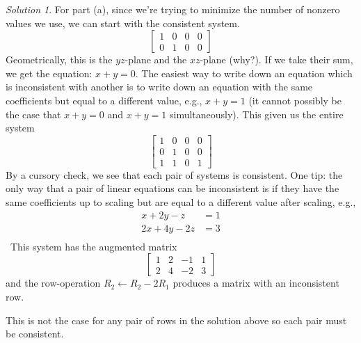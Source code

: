 \documentclass{article}
\theoremstyle{remark}
\newtheorem*{solution}{Solution}
\begin{document}
\begin{solution}
  For part (a), since we're trying to minimize the number of nonzero values we use, we can start with the consistent system.
  \begin{displaymath}
    \begin{bmatrix}
      1 & 0 & 0 & 0 \\
      0 & 1 & 0 & 0
    \end{bmatrix}
  \end{displaymath}
  Geometrically, this is the $yz$-plane and the $xz$-plane (why?).
  If we take their sum, we get the equation: $x + y = 0$.
  The easiest way to write down an equation which is inconsistent with another is to write down an equation with the same coefficients but equal to a different value, e.g., $x + y = 1$ (it cannot possibly be the case that $x + y = 0$ and $x + y = 1$ simultaneously).
  This given us the entire system
  \begin{displaymath}
    \begin{bmatrix}
      1 & 0 & 0 & 0 \\
      0 & 1 & 0 & 0 \\
      1 & 1 & 0 & 1
    \end{bmatrix}
  \end{displaymath}
  By a cursory check, we see that each pair of systems is consistent.
  One tip: the only way that a pair of linear equations can be inconsistent is if they have the same coefficients up to scaling but are equal to a different value after scaling, e.g.,
  \begin{align*}
    x + 2y - z &= 1 \\
    2x + 4y - 2z &= 3 \\
  \end{align*}
\  This system has the augmented matrix
  \begin{displaymath}
    \begin{bmatrix}
      1 & 2 & -1 & 1 \\
      2 & 4 & -2 & 3
    \end{bmatrix}
  \end{displaymath}
  and the row-operation $R_2 \gets R_2 - 2R_1$ produces a matrix with an inconsistent row.

  This is not the case for any pair of rows in the solution above so each pair must be consistent.


\end{solution}
\end{document}
